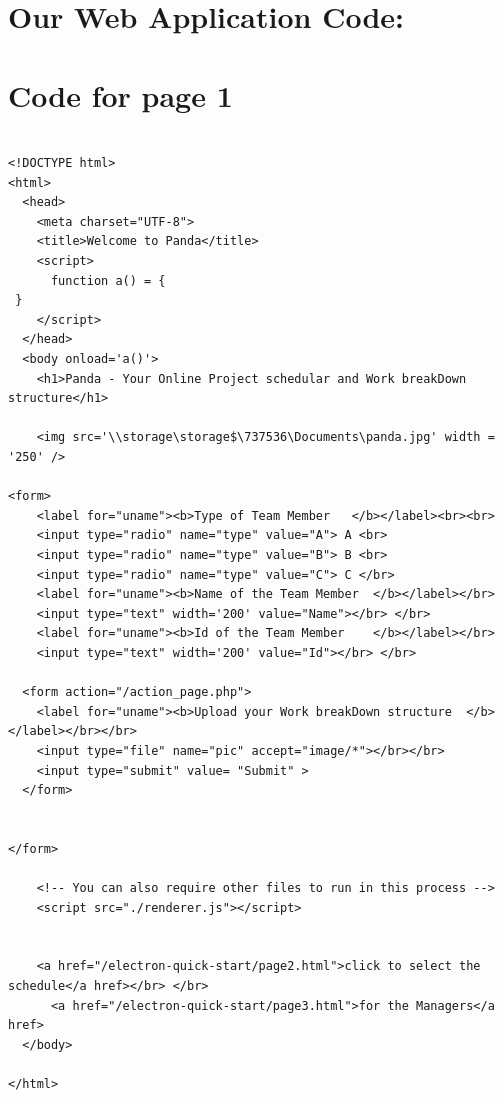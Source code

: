\documentclass{article}
\begin{document}
\section * {Our Web Application Code:}
\section *{Code for page 1}
\begin{verbatim}

<!DOCTYPE html>
<html>
  <head>
    <meta charset="UTF-8">
    <title>Welcome to Panda</title>
    <script>
      function a() = {
 }
    </script>
  </head>
  <body onload='a()'>
    <h1>Panda - Your Online Project schedular and Work breakDown structure</h1>
    
    <img src='\\storage\storage$\737536\Documents\panda.jpg' width = '250' />
    
<form>
    <label for="uname"><b>Type of Team Member   </b></label><br><br>
    <input type="radio" name="type" value="A"> A <br>
    <input type="radio" name="type" value="B"> B <br>
    <input type="radio" name="type" value="C"> C </br>
    <label for="uname"><b>Name of the Team Member  </b></label></br>
    <input type="text" width='200' value="Name"></br> </br>
    <label for="uname"><b>Id of the Team Member    </b></label></br>
    <input type="text" width='200' value="Id"></br> </br>

  <form action="/action_page.php">
    <label for="uname"><b>Upload your Work breakDown structure  </b></label></br></br>
    <input type="file" name="pic" accept="image/*"></br></br>
    <input type="submit" value= "Submit" >
  </form>

  
</form>

    <!-- You can also require other files to run in this process -->
    <script src="./renderer.js"></script>


    <a href="/electron-quick-start/page2.html">click to select the schedule</a href></br> </br>
      <a href="/electron-quick-start/page3.html">for the Managers</a href>
  </body>
  
</html>



\end{verbatim}
\end{document}
